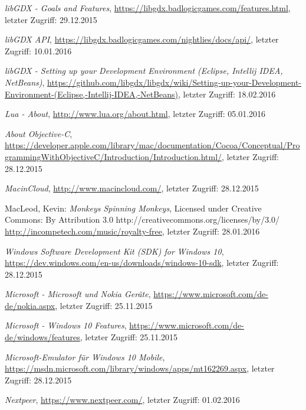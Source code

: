 \begin{thebibliography}{}
\emph{libGDX - Goals and Features},
\url{https://libgdx.badlogicgames.com/features.html}, letzter Zugriff: 29.12.2015

\emph{libGDX API},
\url{https://libgdx.badlogicgames.com/nightlies/docs/api/}, letzter Zugriff: 10.01.2016

\emph{libGDX - Setting up your Development Environment (Eclipse, Intellij IDEA, NetBeans)},
\url{https://github.com/libgdx/libgdx/wiki/Setting-up-your-Development-Environment-(Eclipse,-Intellij-IDEA,-NetBeans)}, letzter Zugriff: 18.02.2016

\emph{Lua - About},
\url{http://www.lua.org/about.html}, letzter Zugriff: 05.01.2016

\emph{About Objective-C},
\url{https://developer.apple.com/library/mac/documentation/Cocoa/Conceptual/ProgrammingWithObjectiveC/Introduction/Introduction.html/}, letzter Zugriff: 28.12.2015

\emph{MacinCloud},
\url{http://www.macincloud.com/}, letzter Zugriff: 28.12.2015

MacLeod, Kevin:
\emph{Monkeys Spinning Monkeys},
Licensed under Creative Commons: By Attribution 3.0
http://creativecommons.org/licenses/by/3.0/
\url{http://incompetech.com/music/royalty-free}, letzter Zugriff: 28.01.2016

\emph{Windows Software Development Kit (SDK) for Windows 10},
\url{https://dev.windows.com/en-us/downloads/windows-10-sdk}, letzter Zugriff: 28.12.2015

\emph{Microsoft - Microsoft und Nokia Geräte},
\url{https://www.microsoft.com/de-de/nokia.aspx}, letzter Zugriff: 25.11.2015

\emph{Microsoft - Windows 10 Features},
\url{https://www.microsoft.com/de-de/windows/features}, letzter Zugriff: 25.11.2015

\emph{Microsoft-Emulator für Windows 10 Mobile},
\url{https://msdn.microsoft.com/library/windows/apps/mt162269.aspx}, letzter Zugriff: 28.12.2015

\emph{Nextpeer},
\url{https://www.nextpeer.com/}, letzter Zugriff: 01.02.2016


\end{thebibliography}
